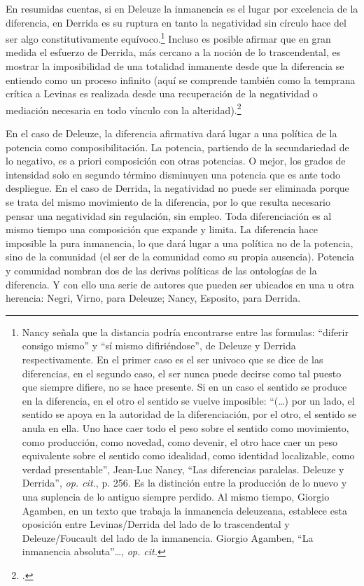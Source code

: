 En resumidas cuentas, si en Deleuze la inmanencia es el lugar por
excelencia de la diferencia, en Derrida es su ruptura en tanto la
negatividad sin círculo hace del ser algo constitutivamente
equívoco.\footnote{Nancy señala que la distancia podría encontrarse entre
  las formulas: \enquote{diferir consigo mismo} y \enquote{sí mismo difiriéndose}, de
  Deleuze y Derrida respectivamente. En el primer caso es el ser univoco
  que se dice de las diferencias, en el segundo caso, el ser nunca puede
  decirse como tal puesto que siempre difiere, no se hace presente. Si
  en un caso el sentido se produce en la diferencia, en el otro el
  sentido se vuelve imposible: \enquote{(\dots) por un lado, el sentido se
  apoya en la autoridad de la diferenciación, por el otro, el sentido se
  anula en ella. Uno hace caer todo el peso sobre el sentido como
  movimiento, como producción, como novedad, como devenir, el otro hace
  caer un peso equivalente sobre el sentido como idealidad, como
  identidad localizable, como verdad presentable}, Jean-Luc Nancy, \enquote{Las
  diferencias paralelas. Deleuze y Derrida}, \emph{op. cit.}, p. 256. Es
  la distinción entre la producción de lo nuevo y una suplencia de lo
  antiguo siempre perdido. Al mismo tiempo, Giorgio Agamben, en un texto
  que trabaja la inmanencia deleuzeana, establece esta oposición entre
  Levinas/Derrida del lado de lo trascendental y Deleuze/Foucault del
  lado de la inmanencia. Giorgio Agamben, \enquote{La inmanencia
  absoluta}\ldots, \emph{op. cit.}} Incluso es posible afirmar que en
gran medida el esfuerzo de Derrida, más cercano a la noción de lo
trascendental, es mostrar la imposibilidad de una totalidad inmanente
desde que la diferencia se entiendo como un proceso infinito (aquí se
comprende también como la temprana crítica a Levinas es realizada desde
una recuperación de la negatividad o mediación necesaria en todo vínculo
con la alteridad).\footcite{derrida1989c}

En el caso de Deleuze, la diferencia afirmativa dará lugar a una
política de la potencia como composibilitación. La potencia, partiendo
de la secundariedad de lo negativo, es a priori composición con otras
potencias. O mejor, los grados de intensidad solo en segundo término
disminuyen una potencia que es ante todo despliegue. En el caso de
Derrida, la negatividad no puede ser eliminada porque se trata del mismo
movimiento de la diferencia, por lo que resulta necesario pensar una
negatividad sin regulación, sin empleo. Toda diferenciación es al mismo
tiempo una composición que expande y limita. La diferencia hace
imposible la pura inmanencia, lo que dará lugar a una política no de la
potencia, sino de la comunidad (el ser de la comunidad como su propia
ausencia). Potencia y comunidad nombran dos de las derivas políticas de
las ontologías de la diferencia. Y con ello una serie de autores que
pueden ser ubicados en una u otra herencia: Negri, Virno, para Deleuze;
Nancy, Esposito, para Derrida.

